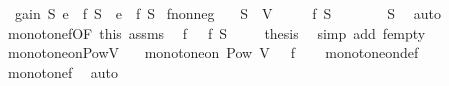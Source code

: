\begin{isabellebody}
\ \ {\isachardoublequoteopen}gain\ S\ e\ {\isacharequal}{\kern0pt}\ f\ {\isacharparenleft}{\kern0pt}S\ {\isasymunion}\ {\isacharbraceleft}{\kern0pt}e{\isacharbraceright}{\kern0pt}{\isacharparenright}{\kern0pt}\ {\isacharminus}{\kern0pt}\ f\ S{\isachardoublequoteclose}\isanewline
\isanewline
{}\isamarkupfalse%
\ f{\isacharunderscore}{\kern0pt}nonneg{\isacharcolon}{\kern0pt}\isanewline
\ \ \ {\isachardoublequoteopen}S\ {\isasymsubseteq}\ V{\isachardoublequoteclose}\isanewline
\ \ \ {\isachardoublequoteopen}{}\ {\isasymle}\ f\ S{\isachardoublequoteclose}\isanewline
%
\isadelimproof
%
\endisadelimproof
%
\isatagproof
{}\isamarkupfalse%
\ {\isacharminus}{\kern0pt}\isanewline
\ \ \isamarkupfalse%
\ {\isachardoublequoteopen}{\isacharbraceleft}{\kern0pt}{\isacharbraceright}{\kern0pt}\ {\isasymsubseteq}\ S{\isachardoublequoteclose}\ \isamarkupfalse%
\ auto\isanewline
\ \ \isamarkupfalse%
\ monotone{\isacharunderscore}{\kern0pt}f{\isacharbrackleft}{\kern0pt}OF\ this\ assms{\isacharbrackright}{\kern0pt}\ \isamarkupfalse%
\ {\isachardoublequoteopen}f\ {\isacharbraceleft}{\kern0pt}{\isacharbraceright}{\kern0pt}\ {\isasymle}\ f\ S{\isachardoublequoteclose}\ \isakeywordONE{{\isachardot}{\kern0pt}}\isamarkupfalse%
\isanewline
\ \ \isamarkupfalse%
\ {\isacharquery}{\kern0pt}thesis\ \isamarkupfalse%
\ {\isacharparenleft}{\kern0pt}simp\ add{\isacharcolon}{\kern0pt}\ f{\isacharunderscore}{\kern0pt}empty{\isacharparenright}{\kern0pt}\isanewline
{}\isamarkupfalse%
%
\endisatagproof
{\isafoldproof}%
%
\isadelimproof
\isanewline
%
\endisadelimproof
\isanewline
{}\isamarkupfalse%
\ monotone{\isacharunderscore}{\kern0pt}on{\isacharunderscore}{\kern0pt}PowV{\isacharcolon}{\kern0pt}\isanewline
\ \ \ {\isachardoublequoteopen}monotone{\isacharunderscore}{\kern0pt}on\ {\isacharparenleft}{\kern0pt}Pow\ V{\isacharparenright}{\kern0pt}\ {\isacharparenleft}{\kern0pt}{\isasymsubseteq}{\isacharparenright}{\kern0pt}\ {\isacharparenleft}{\kern0pt}{\isasymle}{\isacharparenright}{\kern0pt}\ f{\isachardoublequoteclose}\isanewline
%
\isadelimproof
\ \ %
\endisadelimproof
%
\isatagproof
{}\isamarkupfalse%
\ monotone{\isacharunderscore}{\kern0pt}on{\isacharunderscore}{\kern0pt}def\isanewline
\ \ \isamarkupfalse%
\ monotone{\isacharunderscore}{\kern0pt}f\ \isamarkupfalse%
\ auto%

\end{isabellebody}
